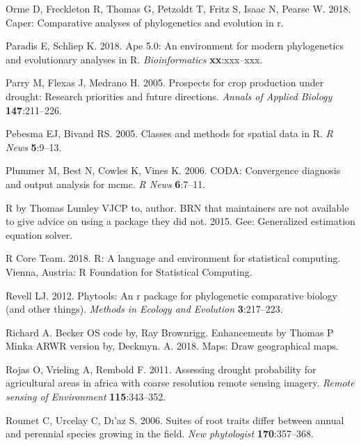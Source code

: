 \documentclass[man,floatsintext]{apa6}
\theoremstyle{definition}
\theoremstyle{definition}
\theoremstyle{definition}
\theoremstyle{remark}
\begin{document}
\leavevmode\hypertarget{ref-R-caper}{}%
Orme D, Freckleton R, Thomas G, Petzoldt T, Fritz S, Isaac N, Pearse W.
2018. Caper: Comparative analyses of phylogenetics and evolution in r.

\leavevmode\hypertarget{ref-R-ape}{}%
Paradis E, Schliep K. 2018. Ape 5.0: An environment for modern
phylogenetics and evolutionary analyses in R. \emph{Bioinformatics}
\textbf{xx}:xxx--xxx.

\leavevmode\hypertarget{ref-parry2005prospects}{}%
Parry M, Flexas J, Medrano H. 2005. Prospects for crop production under
drought: Research priorities and future directions. \emph{Annals of
Applied Biology} \textbf{147}:211--226.

\leavevmode\hypertarget{ref-R-sp}{}%
Pebesma EJ, Bivand RS. 2005. Classes and methods for spatial data in R.
\emph{R News} \textbf{5}:9--13.

\leavevmode\hypertarget{ref-R-coda}{}%
Plummer M, Best N, Cowles K, Vines K. 2006. CODA: Convergence diagnosis
and output analysis for mcmc. \emph{R News} \textbf{6}:7--11.

\leavevmode\hypertarget{ref-R-gee}{}%
R by Thomas Lumley VJCP to, author. BRN that maintainers are not
available to give advice on using a package they did not. 2015. Gee:
Generalized estimation equation solver.

\leavevmode\hypertarget{ref-R-base}{}%
R Core Team. 2018. R: A language and environment for statistical
computing. Vienna, Austria: R Foundation for Statistical Computing.

\leavevmode\hypertarget{ref-R-phytools}{}%
Revell LJ. 2012. Phytools: An r package for phylogenetic comparative
biology (and other things). \emph{Methods in Ecology and Evolution}
\textbf{3}:217--223.

\leavevmode\hypertarget{ref-R-maps}{}%
Richard A. Becker OS code by, Ray Brownrigg. Enhancements by Thomas P
Minka ARWR version by, Deckmyn. A. 2018. Maps: Draw geographical maps.

\leavevmode\hypertarget{ref-rojas2011assessing}{}%
Rojas O, Vrieling A, Rembold F. 2011. Assessing drought probability for
agricultural areas in africa with coarse resolution remote sensing
imagery. \emph{Remote sensing of Environment} \textbf{115}:343--352.

\leavevmode\hypertarget{ref-roumet2006suites}{}%
Roumet C, Urcelay C, Dı'az S. 2006. Suites of root traits differ between
annual and perennial species growing in the field. \emph{New
phytologist} \textbf{170}:357--368.
\end{document}
